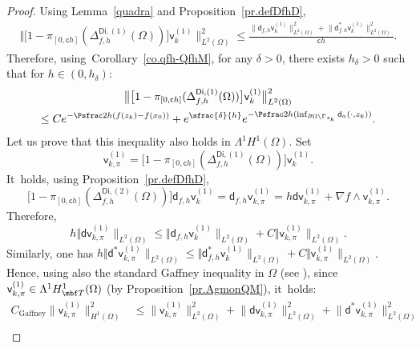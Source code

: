 \begin{proof}
Using Lemma~\ref{quadra} and Proposition~\ref{pr.defDfhD},\vspace*{-3pt}
\begin{align*}
\big \Vert \big[1-\pi_{[0,\mathsf ch]} (\Delta_{f,h}^{\mathsf{Di},(1)} (\Omega)) \big] \mathsf v_k^{(1)} \big \|^{2}_{ L^{2} (\Omega)} \le \frac{ \big \| \mathsf d_{f,h} \mathsf v_k^{(1)} \big \|^{2}_{ L^{2} (\Omega)}+
\big \| \mathsf d^{*}_{f,h} \mathsf v_k^{(1)} \big \|^{2}_{ L^{2} (\Omega)}}{\mathsf ch}.
\end{align*}
Therefore, using~Corollary~\ref{co.qfh-QfhM}, for any $\delta>0$,
there exists $h_\delta>0$ such that for $h\in (0,h_\delta)$:\vspace*{-5pt}
\begin{multline*}
\big \Vert \big[1-\pi_{[0,\mathsf ch]} (\Delta_{f,h}^{\mathsf{Di},(1)} (\Omega)) \big] \mathsf v_k^{(1)} \big \|^{2}_{ L^{2} (\Omega)}\\
\le C e^{-\Psfrac 2h(f(z_k)-f(x_0))}+e^{\sfrac{ \delta }{h}} e^{-\Psfrac 2h(\inf_{ \partial \Omega \setminus \Gamma_{z_k}} \mathsf d_a(\cdot,z_k))}.
\end{multline*}
Let us prove that this inequality also holds in $\Lambda^1H^1(\Omega)$.
Set
\[
\mathsf v_{k,\pi}^{(1)}=\big[1-\pi_{[0,\mathsf ch]} (\Delta_{f,h}^{\mathsf{Di},(1)} (\Omega)) \big] \mathsf v_k^{(1)}.
\]
It~holds, using Proposition~\ref{pr.defDfhD},
\[
\big[1-\pi_{[0,\mathsf ch]} (\Delta_{f,h}^{\mathsf{Di},(2)} (\Omega)) \big]\mathsf d_{f,h} \mathsf v_k^{(1)} = \mathsf d_{f,h}\mathsf v_{k,\pi}^{(1)}=h\mathsf d \mathsf v_{k,\pi}^{(1)} +\nabla f\wedge \mathsf v_{k,\pi}^{(1)}.
\]
Therefore,
\[
h \Vert \mathsf d \mathsf v_{k,\pi}^{(1)} \|_{ L^{2} (\Omega)} \le \Vert \mathsf d_{f,h} \mathsf v_k^{(1)} \|_{ L^{2} (\Omega)} + C\Vert \mathsf v_{k,\pi}^{(1)} \|_{ L^{2} (\Omega)}.
\]
Similarly, one has $h \Vert \mathsf d^* \mathsf v_{k,\pi}^{(1)} \|_{ L^{2} (\Omega)} \le \Vert \mathsf d^*_{f,h} \mathsf v_k^{(1)} \|_{ L^{2} (\Omega)} + C\Vert \mathsf v_{k,\pi}^{(1)} \|_{ L^{2} (\Omega)}$.
Hence, using also the standard Gaffney inequality in $\Omega$ (see \cite{GSchw}), since $\mathsf v_{k,\pi}^{(1)}\in \Lambda^1H^1_{\mbf T}(\Omega)$ (by Proposition~\ref{pr.AgmonQM}), it~holds:
\begin{align}
\nonumber
C_{\text{Gaffney}}\big \| \mathsf v_{k,\pi}^{(1)} \big \|^{2}_{ H^1 (\Omega)}&\le \big \| \mathsf v_{k,\pi}^{(1)} \big \|^{2}_{ L^{2} (\Omega)} + \big \| \mathsf d \mathsf v_{k,\pi}^{(1)} \big \|^{2}_{ L^{2} (\Omega)}+
\big \| \mathsf d^{*} \mathsf v_{k,\pi}^{(1)} \big \|^{2}_{ L^{2} (\Omega)}\\

\end{align}
\end{proof}
